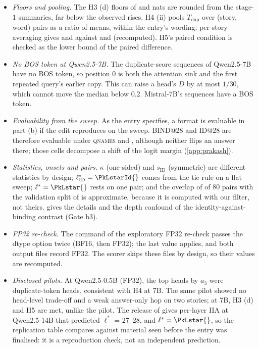 \begin{itemize}
  \item \emph{Floors and pooling.} The H3 (d) floors of \HthreeFloorQwenSeven{} and \HthreeFloorMistralSeven{} nats are rounded from the stage-1 summaries, far below the observed rises. H4 (ii) pools $T_{\mathrm{dup}}$ over (story, word) pairs as a ratio of means, within the entry's wording; per-story averaging gives \HfourTstoryQwenSeven{} and \HfourTstoryMistralSeven{} against \HfourTQwenSeven{} and \HfourTMistralSeven{} (recomputed). H5's paired condition is checked as the lower bound of the paired difference.
  \item \emph{No BOS token at Qwen2.5-7B.} The duplicate-score sequences of Qwen2.5-7B have no BOS token, so position 0 is both the attention sink and the first repeated query's earlier copy. This can raise a head's $D$ by at most $1/30$, which cannot move the median below 0.2. Mistral-7B's sequences have a BOS token.
  \item \emph{Evaluability from the \textup{\fmtNone{}} sweep.} As the entry specifies, a format is evaluable in part (b) if the edit reproduces on the \fmtNone{} sweep. BIND@28 and ID@28 are therefore evaluable under \textsc{qnames} and \fmtOpt{}, although neither flips an answer there; those cells decompose a shift of the logit margin (\cref{app:prakash}).
  \item \emph{Statistics, onsets and pairs.} $\kappa$ (one-sided) and $s_{\mathrm{ID}}$ (symmetric) are different statistics by design; $\ell^*_{\mathrm{ID}} = \PkLstarId{}$ comes from the tie rule on a flat sweep; $\ell^* = \PkLstar{}$ rests on one pair; and the overlap of \PkOverlap{} of 80 pairs with the validation split of \citet{prakash2025lookbacks} is approximate, because it is computed with our filter, not theirs.  gives the details and the depth confound of the identity-against-binding contrast (Gate b3).
  \item \emph{FP32 re-check.} The command of the exploratory FP32 re-check passes the dtype option twice (BF16, then FP32); the last value applies, and both output files record FP32. The scorer skips these files by design, so their values are recomputed.
  \item \emph{Disclosed pilots.} At Qwen2.5-0.5B (FP32), the top heads by $a_3$ were duplicate-token heads, consistent with H4 at 7B. The same pilot showed no head-level trade-off and a weak answer-only hop on two stories; at 7B, H3 (d) and H5 are met, unlike the pilot. The release of \citet{prakash2025lookbacks} gives per-layer IIA at Qwen2.5-14B that predicted $\ell^*$ = 27--28, and $\ell^* = \PkLstar{}$, so the replication table compares against material seen before the entry was finalised: it is a reproduction check, not an independent prediction.

\end{itemize}
